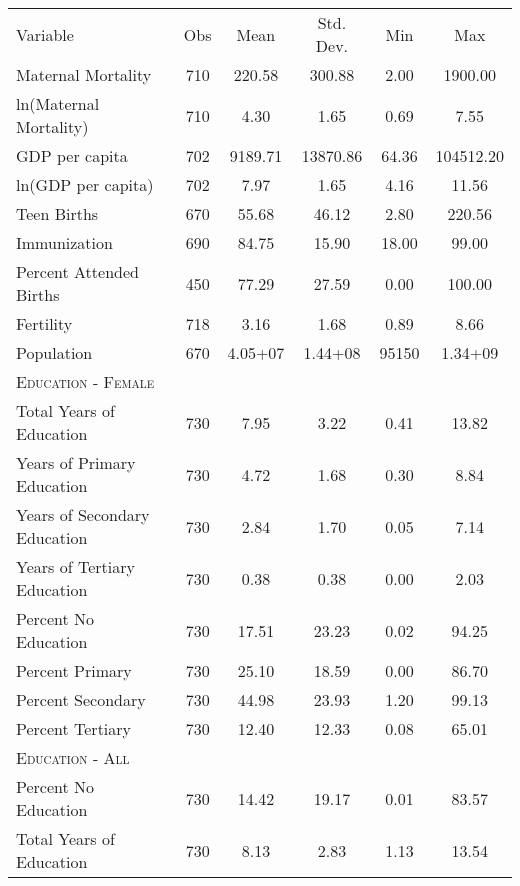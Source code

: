 \begin{subtables}
\begin{table}[htpb!]											
\begin{center}											
\begin{tabular}{l c c c c c}											
& & & & & \\											
\toprule											
Variable	&	Obs	&	Mean	&	Std. Dev.	&	Min	&	Max	\\
\midrule											
Maternal Mortality	&	710	&	220.58	&	300.88	&	2.00	&	1900.00	\\
ln(Maternal Mortality)	&	710	&	4.30	&	1.65	&	0.69	&	7.55	\\
GDP per capita	&	702	&	9189.71	&	13870.86	&	64.36	&	104512.20	\\
ln(GDP per capita)	&	702	&	7.97	&	1.65	&	4.16	&	11.56	\\
Teen Births	&	670	&	55.68	&	46.12	&	2.80	&	220.56	\\
Immunization	&	690	&	84.75	&	15.90	&	18.00	&	99.00	\\
Percent Attended Births	&	450	&	77.29	&	27.59	&	0.00	&	100.00	\\
Fertility	&	718	&	3.16	&	1.68	&	0.89	&	8.66	\\
Population	&	670	&	4.05+07	&	1.44+08	&	95150	&	1.34+09	\\
\midrule											
\multicolumn{6}{l}{\textsc{Education - Female}}  \\											
Total Years of Education	&	730	&	7.95	&	3.22	&	0.41	&	13.82	\\
Years of Primary Education	&	730	&	4.72	&	1.68	&	0.30	&	8.84	\\
Years of Secondary Education	&	730	&	2.84	&	1.70	&	0.05	&	7.14	\\
Years of Tertiary Education	&	730	&	0.38	&	0.38	&	0.00	&	2.03	\\
Percent No Education	&	730	&	17.51	&	23.23	&	0.02	&	94.25	\\
Percent Primary	&	730	&	25.10	&	18.59	&	0.00	&	86.70	\\
Percent Secondary	&	730	&	44.98	&	23.93	&	1.20	&	99.13	\\
Percent Tertiary	&	730	&	12.40	&	12.33	&	0.08	&	65.01	\\
\midrule											
\multicolumn{6}{l}{\textsc{Education - All}}  \\											
Percent No Education	&	730	&	14.42	&	19.17	&	0.01	&	83.57	\\
Total Years of Education	&	730	&	8.13	&	2.83	&	1.13	&	13.54	\\

\end{tabular}
\end{center}
\end{table}
\end{subtables}
